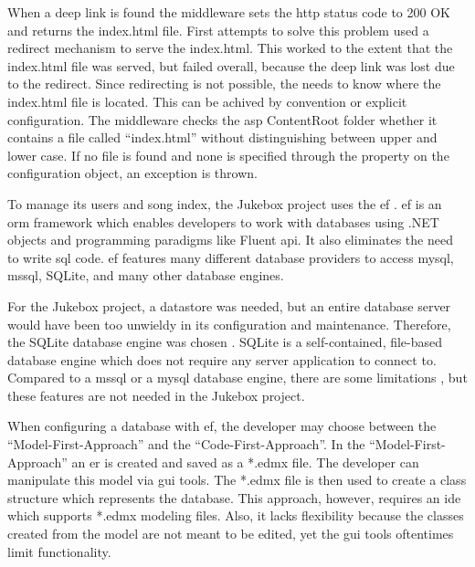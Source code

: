 When a deep link is found the middleware sets the \gls{http} status code to 200 OK and returns the index.html file. First attempts to solve this problem used a redirect mechanism to serve the index.html. This worked to the extent that the index.html file was served, but failed overall, because the deep link was lost due to the redirect. Since redirecting is not possible, the  needs to know where the index.html file is located. This can be achived by convention or explicit configuration. The middleware checks the \gls{asp} ContentRoot folder whether it contains a file called \enquote{index.html} without distinguishing between upper and lower case. If no file is found and none is specified through the  property on the configuration object, an exception is thrown.

\newpage




To manage its users and song index, the Jukebox project uses the \gls{ef} \cite{efCore}. \gls{ef} is an \gls{orm} framework which enables developers to work with databases using .NET objects and programming paradigms like Fluent \gls{api}. It also eliminates the need to write \gls{sql} code. \gls{ef} features many different database providers to access \gls{mysql}, \gls{mssql}, SQLite, and many other database engines.

For the Jukebox project, a datastore was needed, but an entire database server would have been too unwieldy in its configuration and maintenance. Therefore, the SQLite database engine was chosen \cite{sqlite}. SQLite is a self-contained, file-based database engine which does not require any server application to connect to. Compared to a \gls{mssql} or a \gls{mysql} database engine, there are some limitations \cite{sqliteLimitations}, but these features are not needed in the Jukebox project.


When configuring a database with \gls{ef}, the developer may choose between the \enquote{Model-First-Approach} and the \enquote{Code-First-Approach}. In the \enquote{Model-First-Approach} an \gls{er} is created and saved as a *.edmx file. The developer can manipulate this model via \gls{gui} tools. The *.edmx file is then used to create a class structure which represents the database. This approach, however, requires an \gls{ide} which supports *.edmx modeling files. Also, it lacks flexibility because the classes created from the model are not meant to be edited, yet the \gls{gui} tools oftentimes limit functionality.

